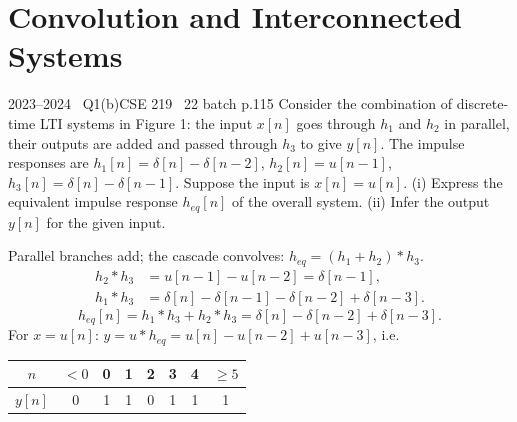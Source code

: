 \renewcommand{\teacherTag}{ANIK SIR \textbullet\ LECTURES 3--4}
\chapter{Convolution and Interconnected Systems}

\begin{qcard}{2023--2024 \textbullet\ Q1(b)}{CSE 219 \textbullet\ 22 batch p.1}{15}
Consider the combination of discrete-time LTI systems in Figure 1: the input $x[n]$ goes through $h_1$ and $h_2$ in parallel, their outputs are added and passed through $h_3$ to give $y[n]$. The impulse responses are $h_1[n]=\delta[n]-\delta[n-2]$, $h_2[n]=u[n-1]$, $h_3[n]=\delta[n]-\delta[n-1]$. Suppose the input is $x[n]=u[n]$.
(i) Express the equivalent impulse response $h_{eq}[n]$ of the overall system. (ii) Infer the output $y[n]$ for the given input.
\end{qcard}
\begin{solution}
Parallel branches add; the cascade convolves: $h_{eq}=(h_1+h_2)*h_3$.
\begin{align*}
h_2*h_3&=u[n-1]-u[n-2]=\delta[n-1],\\
h_1*h_3&=\delta[n]-\delta[n-1]-\delta[n-2]+\delta[n-3].
\end{align*}
\[h_{eq}[n]=h_1*h_3+h_2*h_3=\delta[n]-\delta[n-2]+\delta[n-3].\]
For $x=u[n]$: $y=u*h_{eq}=u[n]-u[n-2]+u[n-3]$, i.e.
\begin{center}\small\begin{tabular}{c|ccccccc}$n$&$<0$&0&1&2&3&4&$\ge5$\\\hline$y[n]$&0&1&1&0&1&1&1\end{tabular}\end{center}
\end{solution}


